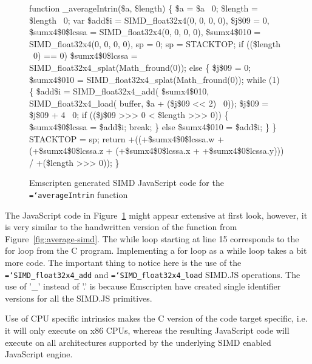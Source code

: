 \documentclass[preprint]{sigplanconf}
\newcommand{\ttt}[1]{{\texttt{\hyphenchar\font=`\-\relax #1}}}%
\begin{document}
\begin{figure}
\begin{small}
\begin{program}[style=tt, number=true]
fu\tab{}nction \_averageIntrin(\$a, \$length) \{
  \$a = \$a \textbar\ 0;
  \$length = \$length \textbar\ 0;
  var \tab{}\$add\$i = SIMD\_float32x4(0, 0, 0, 0),
      \$j\$09 = 0,
      \$sumx4\$0\$lcssa = SIMD\_float32x4(0, 0, 0, 0),
      \$sumx4\$010 = SIMD\_float32x4(0, 0, 0, 0),
      sp = 0;\untab{}
  sp = STACKTOP;
  if\tab{} ((\$length \textbar\ 0) == 0)
    \$sumx4\$0\$lcssa = SIMD\_float32x4\_splat(Math\_fround(0));\untab{}
  el\tab{}se \{
    \$j\$09 = 0;
    \$sumx4\$010 = SIMD\_float32x4\_splat(Math\_fround(0));
    whi\tab{}le (1) \{
      \$a\tab{}dd\$i =
        SI\tab{}MD\_float32x4\_add(
          \$sumx4\$010,
          SIMD\_float32x4\_load(
            buffer, \$a + (\$j\$09 << 2) \textbar\ 0));\untab{}\untab{}
      \$j\$09 = \$j\$09 + 4 \textbar\ 0;
      if\tab{} (\!(\$j\$09 >>> 0 < \$length >>> 0)) \{
        \$sumx4\$0\$lcssa = \$add\$i;
        break;\untab{}
      \} else \$sumx4\$010 = \$add\$i;\untab{}
    \}\untab{}
  \}
  STACKTOP = sp;
  return\tab{} +((+\$sumx4\$0\$lcssa.w + (+\$sumx4\$0\$lcssa.z +
        (+\$sumx4\$0\$lcssa.x + +\$sumx4\$0\$lcssa.y))) /
        +(\$length >>> 0));\untab{}\untab{}
\}
\end{program}
\end{small}
\caption{Emscripten generated SIMD JavaScript code for the \ttt{averageIntrin} function}
\label{fig:average-intrin-js}
\end{figure}

The JavaScript code in Figure~\ref{fig:average-intrin-js} might appear
extensive at first look, however, it is very similar to the handwritten
version of the function from Figure~\ref{fig:average-simd}.  The while loop
starting at line 15 corresponds to the for loop from the C program.  Implementing
a for loop as a while loop takes a bit more code.  The important thing to notice
here is the use of the \ttt{SIMD\_float32x4\_add} and \ttt{SIMD\_float32x4\_load}
SIMD.JS operations.  The use of '\_' instead of '.' is because Emscripten have
created single identifier versions for all the SIMD.JS primitives.

Use of CPU specific intrinsics makes the C version
of the code target specific, i.e. it will only execute on x86 CPUs, whereas the
resulting JavaScript code will execute on all architectures supported by the
underlying SIMD enabled JavaScript engine.
\end{document}
